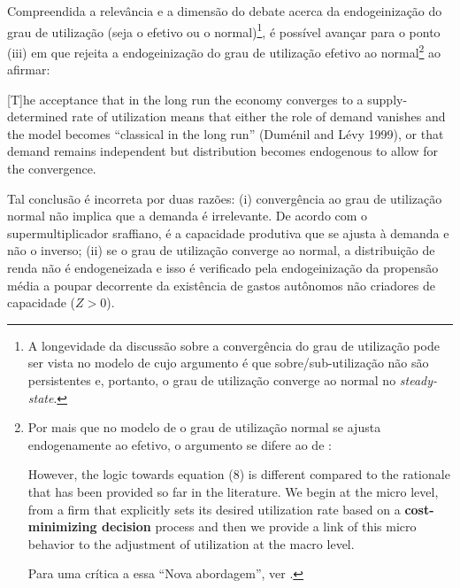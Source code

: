 Compreendida a relevância e a dimensão do debate acerca da endogeinização do grau de utilização (seja o efetivo ou o normal)\footnote{
	A longevidade da discussão sobre a convergência do grau de utilização pode ser vista no modelo de \textcite{vianello_pace_1985} cujo argumento é que sobre/sub-utilização não são persistentes e, portanto, o grau de utilização converge ao normal no \textit{steady-state}.
}, é possível avançar para o ponto (iii) em que \citeauthor*{nikiforos_comments_2018} rejeita a endogeinização do grau de utilização efetivo ao normal\footnote{
	Por mais que no modelo de \textcite{nikiforos_utilization_2016} o grau de utilização normal se ajusta endogenamente ao efetivo, o argumento se difere ao de \textcite{amadeo_role_1986}:
	\begin{citacao}
		However, the logic towards equation (8) is different compared to the rationale that has been provided so far in the literature. We begin at the micro level, from a firm that explicitly sets its desired utilization rate based on a \textbf{cost-minimizing decision} process and then we provide a link of this micro behavior to the adjustment of utilization at the macro level. \cite[p.~456, grifos adicionados e numeração adaptada]{nikiforos_utilization_2016}
	\end{citacao}
	Para uma crítica a essa ``Nova abordagem'', ver \textcite{girardi_normal_2018}.
	
} ao afirmar:

\begin{citacao}
	
	[T]he acceptance that in the long run the economy converges to a supply-determined rate of utilization means that either the role of demand vanishes and the model becomes ``classical in the long run'' (Duménil and Lévy 1999), or that demand remains independent but distribution becomes endogenous to allow for the convergence. \cite[p.~9]{nikiforos_comments_2018}
\end{citacao}
Tal conclusão é incorreta por duas razões: (i) convergência ao grau de utilização normal não implica que a demanda é irrelevante. De acordo com o supermultiplicador sraffiano, é a capacidade produtiva que se ajusta à demanda e não o inverso; (ii) se o grau de utilização converge ao normal, a distribuição de renda não é endogeneizada e isso é verificado pela endogeinização da propensão média a poupar decorrente da existência de gastos autônomos não criadores de capacidade ($Z>0$).

